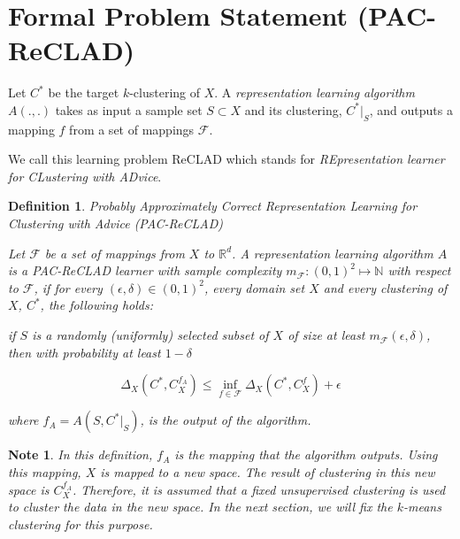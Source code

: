 \documentclass[letterpaper,12pt,titlepage,oneside,final]{book}
\newtheorem{definition}{Definition}
\newtheorem{note}{Note}
\begin{document}
\section{Formal Problem Statement (PAC-ReCLAD)}


Let $C^*$ be the target $k$-clustering of $X$. %
A \textit{representation learning algorithm} $A(.,.)$ takes as input a sample set $S\subset X$ and its clustering, $C^*\Big|_S$, and outputs a mapping $f$ from a set of mappings $\mathcal{F}$. 

We call this learning problem ReCLAD which stands for \textit{REpresentation learner for CLustering with ADvice}. 

\begin{definition}{Probably Approximately Correct Representation Learning for Clustering with Advice  (PAC-ReCLAD)}\label{PACRECLAD}

Let $\mathcal{F}$ be a set of mappings from $X$ to $\mathbb{R}^d$. A representation learning algorithm $A$ is a PAC-ReCLAD learner with sample complexity $m_{\mathcal{F}}:(0,1)^2\mapsto \mathbb{N}$ with respect to $\mathcal{F}$, if for every $(\epsilon,\delta)\in (0,1)^2$, every domain set $X$ and every clustering of $X$, $C^*$, the following holds: 

if $S$ is a randomly (uniformly) selected subset of $X$ of size at least $m_{\mathcal{F}}(\epsilon, \delta)$, then with probability at least $1-\delta$



\begin{equation}
\Delta_{X}(C^*,  C^{f_A}_X) \leq \inf_{f\in \mathcal{F}} \Delta_{X}(C^*,C^{f}_X) + \epsilon
\end{equation}

where $f_A = A(S, C^*\Big|_S)$, is the output of the algorithm.

\end{definition}


\begin{note} In this definition, $f_A$ is the mapping that the algorithm outputs. Using this mapping, $X$ is mapped to a new space. The result of clustering in this new space is $C^{f_A}_X$. Therefore, it is assumed that a fixed unsupervised clustering is used to cluster the data in the new space. In the next section, we will fix the $k$-means clustering for this purpose.
\end{note}
\end{document}
